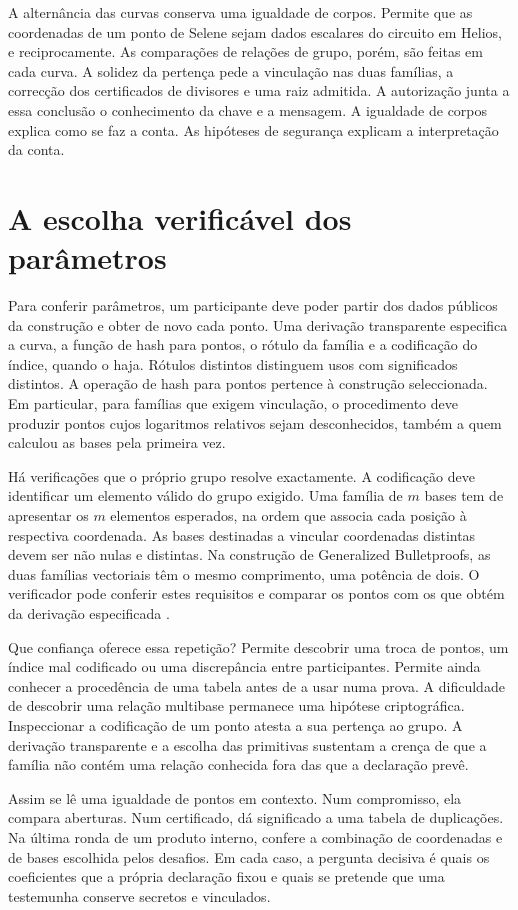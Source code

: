 A alternância das curvas conserva uma igualdade de corpos. Permite
que as coordenadas de um ponto de Selene sejam dados escalares do
circuito em Helios, e reciprocamente. As comparações de relações de
grupo, porém, são feitas em cada curva. A solidez da pertença pede
a vinculação nas duas famílias, a correcção dos certificados de
divisores e uma raiz admitida. A autorização junta a essa conclusão
o conhecimento da chave e a mensagem. A igualdade de corpos explica
como se faz a conta. As hipóteses de segurança explicam a
interpretação da conta.

\section{A escolha verificável dos parâmetros}

Para conferir parâmetros, um participante deve poder partir dos dados
públicos da construção e obter de novo cada ponto. Uma derivação
transparente especifica a curva, a função de hash para pontos, o
rótulo da família e a codificação do índice, quando o haja. Rótulos
distintos distinguem usos com significados distintos. A operação
de hash para pontos pertence à construção seleccionada. Em
particular, para famílias que exigem vinculação, o procedimento deve
produzir pontos cujos logaritmos relativos sejam desconhecidos,
também a quem calculou as bases pela primeira vez.

Há verificações que o próprio grupo resolve exactamente. A
codificação deve identificar um elemento válido do grupo exigido.
Uma família de \(m\) bases tem de apresentar os \(m\) elementos
esperados, na ordem que associa cada posição à respectiva coordenada.
As bases destinadas a vincular coordenadas distintas devem ser não
nulas e distintas. Na construção de Generalized Bulletproofs, as
duas famílias vectoriais têm o mesmo comprimento, uma potência de
dois. O verificador pode conferir estes requisitos e comparar os
pontos com os que obtém da derivação especificada
\cite{monero-oxide-fcmp-source,generalized-bulletproofs-fixed}.

Que confiança oferece essa repetição? Permite descobrir uma troca
de pontos, um índice mal codificado ou uma discrepância entre
participantes. Permite ainda conhecer a procedência de uma tabela
antes de a usar numa prova. A dificuldade de descobrir uma relação
multibase permanece uma hipótese criptográfica. Inspeccionar a
codificação de um ponto atesta a sua pertença ao grupo. A derivação
transparente e a escolha das primitivas sustentam a crença de que a
família não contém uma relação conhecida fora das que a declaração
prevê.

Assim se lê uma igualdade de pontos em contexto. Num compromisso,
ela compara aberturas. Num certificado, dá significado a uma tabela
de duplicações. Na última ronda de um produto interno, confere a
combinação de coordenadas e de bases escolhida pelos desafios. Em
cada caso, a pergunta decisiva é quais os coeficientes que a própria
declaração fixou e quais se pretende que uma testemunha conserve
secretos e vinculados.

\label{page:dlog-relations-end}
